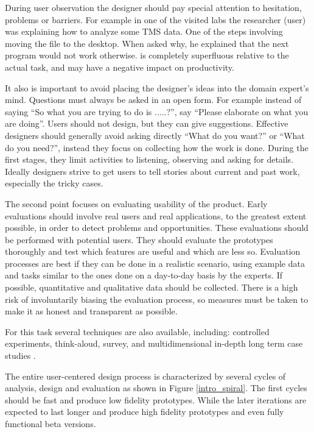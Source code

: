 During user observation the designer should pay special attention to hesitation, problems or barriers. For example in one of the visited labs the researcher (user) was explaining how to analyze some TMS data. One of the steps involving moving the file to the desktop. When asked  why, he explained that the next program would not work otherwise. is completely superfluous relative to the actual task, and may have a negative impact on productivity.  

It also is important to avoid placing the designer's ideas into the domain expert's mind. Questions must always be asked in an open form. For example instead of saying ``So what you are trying to do is .....?'', say ``Please elaborate on what you are doing''. Users should not design, but they can give suggestions. Effective designers should generally avoid asking directly ``What do you want?'' or ``What do you need?'', instead they focus on collecting how the work is done. During the first stages, they limit activities to listening, observing and asking for details. Ideally designers strive to get users to tell stories about current and past work, especially the tricky cases. 

\smallskip

The second point focuses on evaluating usability of the product.  Early evaluations should involve real users and real applications, to the greatest extent possible, in order to detect problems and opportunities. These evaluations should be performed with potential users. They should evaluate the prototypes thoroughly and test which features are useful and which are less so. Evaluation processes are best if they can be done in a realistic scenario, using example data and tasks similar to the ones done on a day-to-day basis by the experts. If possible, quantitative and qualitative data should be collected. There is a high risk of involuntarily biasing the evaluation process, so measures must be taken to make it as honest and transparent as possible. 

For this task several techniques are also available, including: controlled experiments, think-aloud, survey, and multidimensional in-depth long term case studies \autocite{shneiderman_strategies_2006}.

\smallskip

The entire user-centered design process is characterized by several cycles of analysis, design and evaluation as shown in Figure \ref{intro_spiral}. The first cycles should be fast and produce low fidelity prototypes. While the later iterations are expected to last longer and produce high fidelity prototypes and even fully functional beta versions. 


